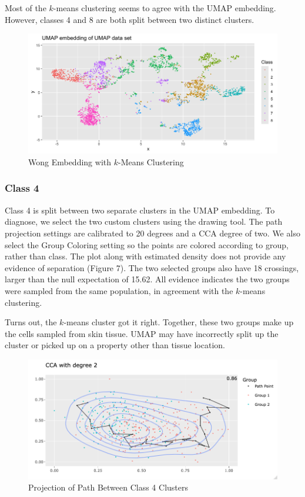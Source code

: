\documentclass{article}
\begin{document}
Most of the $k$-means clustering seems to agree with the UMAP embedding. However, classes 4 and 8 are both split between two distinct clusters.

\renewcommand{\figurename}{Figure}
\renewcommand{\thefigure}{6}
\begin{figure}[!t]
\centering
\includegraphics[scale=0.45]{Wong kmeans}
\caption{Wong Embedding with $k$-Means Clustering}
\end{figure}

\subsubsection{Class 4}
Class 4 is split between two separate clusters in the UMAP embedding. To diagnose, we select the two custom clusters using the drawing tool. The path projection settings are calibrated to 20 degrees and a CCA degree of two. We also select the Group Coloring setting so the points are colored according to group, rather than class. The plot along with estimated density does not provide any evidence of separation (Figure 7). The two selected groups also have 18 crossings, larger than the null expectation of 15.62. All evidence indicates the two groups were sampled from the same population, in agreement with the $k$-means clustering.

Turns out, the $k$-means cluster got it right. Together, these two groups make up the cells sampled from skin tissue. UMAP may have incorrectly split up the cluster or picked up on a property other than tissue location.

\renewcommand{\figurename}{Figure}
\renewcommand{\thefigure}{7}
\begin{figure}[!t]
\centering
\includegraphics[scale=0.45]{class 4 projection Wong}
\caption{Projection of Path Between Class 4 Clusters}
\end{figure}
\end{document}

